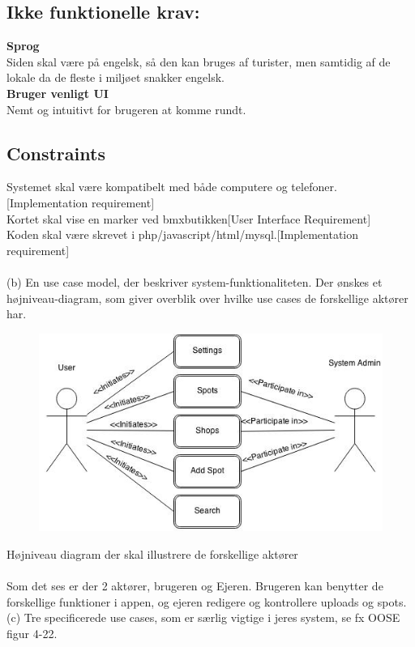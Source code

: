 \documentclass[12pt]{article}
\begin{document}
\subsection*{Ikke funktionelle krav:}
\textbf{Sprog}\\ Siden skal være på engelsk, så den kan bruges af turister, men samtidig af de lokale da de fleste i miljøet snakker engelsk.\\
\textbf{Bruger venligt UI}\\ Nemt og intuitivt for brugeren at komme rundt.\\
\subsection*{Constraints}
Systemet skal være kompatibelt med både computere og telefoner.[Implementation requirement]\\
Kortet skal vise en marker ved bmxbutikken[User Interface Requirement]\\
Koden skal være skrevet i php/javascript/html/mysql.[Implementation requirement]\\
\pagebreak\\

(b) En use case model, der beskriver system-funktionaliteten. Der ønskes et højniveau-diagram,
som giver overblik over hvilke use cases de forskellige aktører har.\\
\begin{figure}[htb]
\begin{center}
\includegraphics[scale = 0.75]{usecasemodel}
\end{center}
\end{figure}

Højniveau diagram der skal illustrere de forskellige aktører\\\\
Som det ses er der 2 aktører, brugeren og Ejeren. Brugeren kan benytter de forskellige funktioner i appen, og ejeren redigere og kontrollere uploads og spots. 
\pagebreak\\
(c) Tre specificerede use cases, som er særlig vigtige i jeres system, se fx OOSE figur 4-22.\\
\setlength\parindent{0pt}
\end{document}
